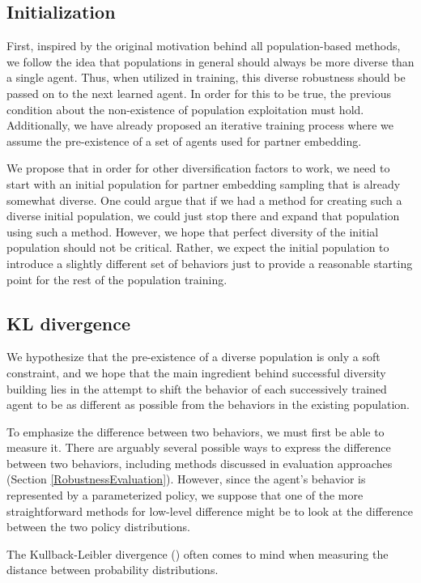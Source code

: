 \subsection{Initialization}
First, inspired by the original motivation behind all population-based methods, we follow the idea that populations in general should always be more diverse than a single agent.
Thus, when utilized in training, this diverse robustness should be passed on to the next learned agent.
In order for this to be true, the previous condition about the non-existence of population exploitation must hold.
Additionally, we have already proposed an iterative training process where we assume the pre-existence of a set of agents used for partner embedding.

We propose that in order for other diversification factors to work, we need to start with an initial population for partner embedding sampling that is already somewhat diverse.
One could argue that if we had a method for creating such a diverse initial population, we could just stop there and expand that population using such a method.
However, we hope that perfect diversity of the initial population should not be critical. 
Rather, we expect the initial population to introduce a slightly different set of behaviors just to provide a reasonable starting point for the rest of the population training.

\subsection{KL divergence}
We hypothesize that the pre-existence of a diverse population is only a soft constraint, and we hope that the main ingredient behind successful diversity building lies in the attempt to shift the behavior of each successively trained agent to be as different as possible from the behaviors in the existing population.



To emphasize the difference between two behaviors, we must first be able to measure it.
There are arguably several possible ways to express the difference between two behaviors, including methods discussed in evaluation approaches (Section \ref{RobustnessEvaluation}).
However, since the agent's behavior is represented by a parameterized policy, we suppose that one of the more straightforward methods for low-level difference might be to look at the difference between the two policy distributions.

The Kullback-Leibler divergence (\cite{KLDivergence}) often comes to mind when measuring the distance between probability distributions.


